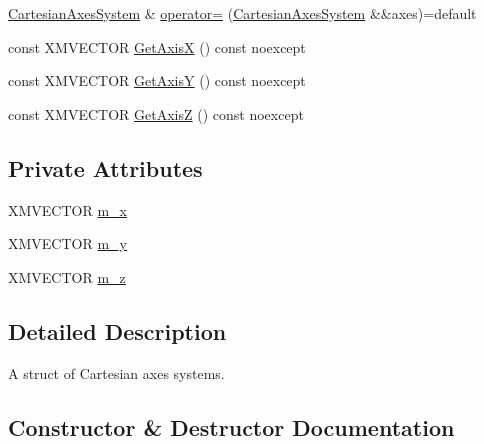 \begin{DoxyCompactItemize}
\hyperlink{structmage_1_1_cartesian_axes_system}{Cartesian\+Axes\+System} \& \hyperlink{structmage_1_1_cartesian_axes_system_ad35384f10ad5a84787ef0cc5507955e9}{operator=} (\hyperlink{structmage_1_1_cartesian_axes_system}{Cartesian\+Axes\+System} \&\&axes)=default
\item 
const X\+M\+V\+E\+C\+T\+OR \hyperlink{structmage_1_1_cartesian_axes_system_af354a35914450f7f8c2d649d70bb4033}{Get\+AxisX} () const noexcept
\item 
const X\+M\+V\+E\+C\+T\+OR \hyperlink{structmage_1_1_cartesian_axes_system_af93e2cc21d2a297b5fb449a2f4c2dcdf}{Get\+AxisY} () const noexcept
\item 
const X\+M\+V\+E\+C\+T\+OR \hyperlink{structmage_1_1_cartesian_axes_system_a8809875b3e960531df80bca9e33e5ca6}{Get\+AxisZ} () const noexcept
\end{DoxyCompactItemize}
\subsection*{Private Attributes}
\begin{DoxyCompactItemize}
\item 
X\+M\+V\+E\+C\+T\+OR \hyperlink{structmage_1_1_cartesian_axes_system_aa840c10ca92782e8c87c1ab53f0b86e9}{m\+\_\+x}
\item 
X\+M\+V\+E\+C\+T\+OR \hyperlink{structmage_1_1_cartesian_axes_system_a2cc6bc4fe185791a877e1418e85d6b47}{m\+\_\+y}
\item 
X\+M\+V\+E\+C\+T\+OR \hyperlink{structmage_1_1_cartesian_axes_system_abc733e5f82104391b0b352d263313d64}{m\+\_\+z}
\end{DoxyCompactItemize}


\subsection{Detailed Description}
A struct of Cartesian axes systems. 

\subsection{Constructor \& Destructor Documentation}
\hypertarget{structmage_1_1_cartesian_axes_system_a8f6ebcd50aafda44c478b7aa25e1fd25}{}\label{structmage_1_1_cartesian_axes_system_a8f6ebcd50aafda44c478b7aa25e1fd25} 
